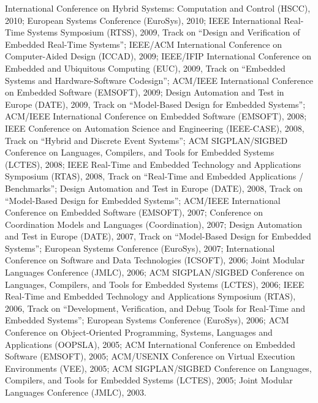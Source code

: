 {\begin{itemize}
International Conference on Hybrid Systems: Computation and Control (HSCC), 2010;
European Systems Conference (EuroSys), 2010;
IEEE International Real-Time Systems Symposium (RTSS), 2009, Track on ``Design and Verification of Embedded Real-Time Systems'';
IEEE/ACM International Conference on Computer-Aided Design (ICCAD), 2009;
IEEE/IFIP International Conference on Embedded and Ubiquitous Computing (EUC), 2009, Track on ``Embedded Systems and Hardware-Software Codesign'';
ACM/IEEE International Conference on Embedded Software (EMSOFT), 2009;
Design Automation and Test in Europe (DATE), 2009, Track on ``Model-Based Design for Embedded Systems'';
ACM/IEEE International Conference on Embedded Software (EMSOFT), 2008;
IEEE Conference on Automation Science and Engineering (IEEE-CASE), 2008, Track on ``Hybrid and Discrete Event
Systems'';
ACM SIGPLAN/SIGBED Conference on Languages, Compilers, and Tools for Embedded Systems (LCTES), 2008;
IEEE Real-Time and Embedded Technology and Applications Symposium (RTAS), 2008, Track on ``Real-Time and Embedded Applications / Benchmarks'';
Design Automation and Test in Europe (DATE), 2008, Track on ``Model-Based Design for Embedded Systems'';
ACM/IEEE International Conference on Embedded Software (EMSOFT), 2007;
Conference on Coordination Models and Languages (Coordination), 2007;
Design Automation and Test in Europe (DATE), 2007, Track on ``Model-Based Design for Embedded Systems'';
European Systems Conference (EuroSys), 2007;
International Conference on Software and Data Technologies (ICSOFT), 2006;
Joint Modular Languages Conference (JMLC), 2006;
ACM SIGPLAN/SIGBED Conference on Languages, Compilers, and Tools for Embedded Systems (LCTES), 2006;
IEEE Real-Time and Embedded Technology and Applications Symposium (RTAS), 2006, Track on ``Development, Verification, and Debug Tools for Real-Time and Embedded Systems'';
European Systems Conference (EuroSys), 2006;
ACM Conference on Object-Oriented Programming, Systems, Languages and Applications (OOPSLA), 2005;
ACM International Conference on Embedded Software (EMSOFT), 2005;
ACM/USENIX Conference on Virtual Execution Environments (VEE), 2005;
ACM SIGPLAN/SIGBED Conference on Languages, Compilers, and Tools for Embedded Systems (LCTES), 2005;
Joint Modular Languages Conference (JMLC), 2003.
\end{itemize}
}


